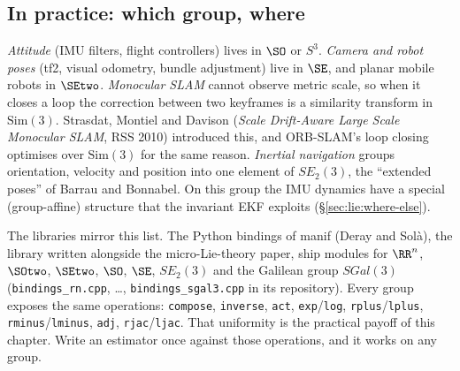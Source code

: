 \subsection{In practice: which group, where}\label{sec:lie:groups-in-practice}

\emph{Attitude} (IMU filters, flight controllers) lives in $\SO$ or $S^3$. \emph{Camera and robot poses} (tf2, visual odometry, bundle adjustment) live in $\SE$, and planar mobile robots in $\SEtwo$. \emph{Monocular SLAM} cannot observe metric scale, so when it closes a loop the correction between two keyframes is a similarity transform in $\mathrm{Sim}(3)$. Strasdat, Montiel and Davison (\emph{Scale Drift-Aware Large Scale Monocular SLAM}, RSS 2010) introduced this, and ORB-SLAM's loop closing optimises over $\mathrm{Sim}(3)$ for the same reason. \emph{Inertial navigation} groups orientation, velocity and position into one element of $SE_2(3)$, the ``extended poses'' of Barrau and Bonnabel. On this group the IMU dynamics have a special (group-affine) structure that the invariant EKF exploits (\S\ref{sec:lie:where-else}).

The libraries mirror this list. The Python bindings of manif (Deray and Solà), the library written alongside the micro-Lie-theory paper, ship modules for $\RR^n$, $\SOtwo$, $\SEtwo$, $\SO$, $\SE$, $SE_2(3)$ and the Galilean group $SGal(3)$ (\texttt{bindings\_rn.cpp}, \dots, \texttt{bindings\_sgal3.cpp} in its repository). Every group exposes the same operations: \texttt{compose}, \texttt{inverse}, \texttt{act}, \texttt{exp}/\texttt{log}, \texttt{rplus}/\texttt{lplus}, \texttt{rminus}/\texttt{lminus}, \texttt{adj}, \texttt{rjac}/\texttt{ljac}. That uniformity is the practical payoff of this chapter. Write an estimator once against those operations, and it works on any group.
